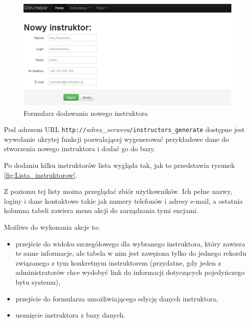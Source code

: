 \documentclass[twoside,a4paper,openright,12pt]{book}
\begin{document}
\begin{figure}[H]
\centering
\includegraphics[width=1\textwidth]{screenshots/panel/nowy_instruktor.png}
\caption{Formularz dodawania nowego instruktora}
\label{fig:Nowy_instruktor}
\end{figure}

Pod adresem URL \texttt{http://}\textit{adres\_serwera}\texttt{/instructors\_generate} dostępne jest wywołanie ukrytej funkcji pozwalającej wygenerować przykładowe dane do stworzenia nowego instruktora i dodać go do bazy.

Po dodaniu kilku instruktorów lista wygląda tak, jak to przedstawia rysunek \ref{fig:Lista_instruktorow}.

Z poziomu tej listy można przeglądać zbiór użytkowników. Ich pełne nazwy, loginy i dane kontaktowe takie jak numery telefonów i adresy e-mail, a ostatnia kolumna tabeli zawiera menu akcji do zarządzania tymi encjami.

Możliwe do wykonania akcje to: 
\begin{itemize}
\item przejście do widoku szczegółowego dla wybranego instruktora, który zawiera te same informacje, ale tabela w nim jest zawężona tylko do jednego rekordu związanego z tym konkretnym instruktorem (przydatne, gdy jeden z administratorów chce wydobyć link do informacji dotyczących pojedyńczego bytu systemu),
\item przejście do formularza umożliwiającego edycję danych instruktora,
\item usunięcie instruktora z bazy danych.
\end{itemize}
\end{document}
